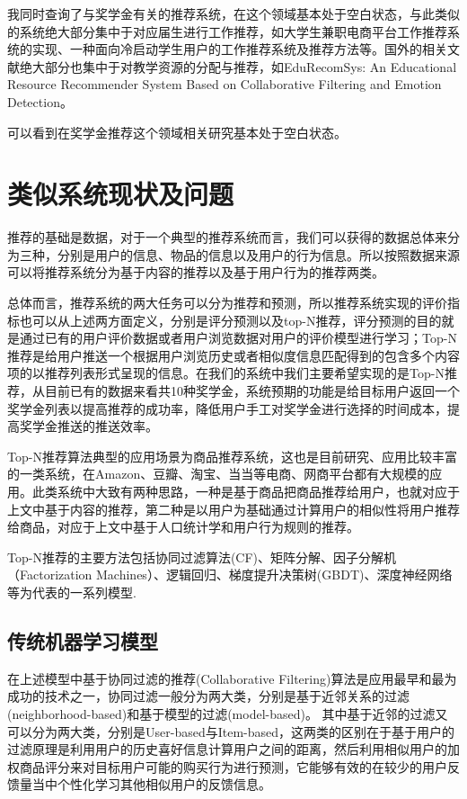 我同时查询了与奖学金有关的推荐系统，在这个领域基本处于空白状态，与此类似的系统绝大部分集中于对应届生进行工作推荐，如大学生兼职电商平台工作推荐系统的实现\cite{郭洁畅2017大学生兼职电商平台工作推荐系统的实现}、一种面向冷启动学生用户的工作推荐系统及推荐方法\cite{一种面向冷启动学生用户的工作推荐系统及推荐方法}等。国外的相关文献绝大部分也集中于对教学资源的分配与推荐，如EduRecomSys: An Educational Resource Recommender System Based on Collaborative Filtering and Emotion Detection\cite{bustos2020edurecomsys}。

可以看到在奖学金推荐这个领域相关研究基本处于空白状态。

\section{类似系统现状及问题}

推荐的基础是数据，对于一个典型的推荐系统而言，我们可以获得的数据总体来分为三种，分别是用户的信息、物品的信息以及用户的行为信息。所以按照数据来源可以将推荐系统分为基于内容的推荐以及基于用户行为的推荐两类。

总体而言，推荐系统的两大任务可以分为推荐和预测，所以推荐系统实现的评价指标也可以从上述两方面定义，分别是评分预测以及top-N推荐，评分预测的目的就是通过已有的用户评价数据或者用户浏览数据对用户的评价模型进行学习；Top-N推荐是给用户推送一个根据用户浏览历史或者相似度信息匹配得到的包含多个内容项的以推荐列表形式呈现的信息。在我们的系统中我们主要希望实现的是Top-N推荐，从目前已有的数据来看共10种奖学金，系统预期的功能是给目标用户返回一个奖学金列表以提高推荐的成功率，降低用户手工对奖学金进行选择的时间成本，提高奖学金推送的推送效率。

Top-N推荐算法典型的应用场景为商品推荐系统，这也是目前研究、应用比较丰富的一类系统，在Amazon、豆瓣、淘宝、当当等电商、网商平台都有大规模的应用。此类系统中大致有两种思路，一种是基于商品把商品推荐给用户，也就对应于上文中基于内容的推荐，第二种是以用户为基础通过计算用户的相似性将用户推荐给商品，对应于上文中基于人口统计学和用户行为规则的推荐。

Top-N推荐的主要方法包括协同过滤算法(CF)、矩阵分解、因子分解机（Factorization Machines）、逻辑回归、梯度提升决策树(GBDT)、深度神经网络等为代表的一系列模型.

\subsection{传统机器学习模型}

在上述模型中基于协同过滤的推荐(Collaborative Filtering)算法是应用最早和最为成功的技术之一，协同过滤一般分为两大类，分别是基于近邻关系的过滤(neighborhood-based)和基于模型的过滤(model-based)。
其中基于近邻的过滤又可以分为两大类，分别是User-based与Item-based，这两类的区别在于基于用户的过滤原理是利用用户的历史喜好信息计算用户之间的距离，然后利用相似用户的加权商品评分来对目标用户可能的购买行为进行预测，它能够有效的在较少的用户反馈量当中个性化学习其他相似用户的反馈信息\cite{姜保庆2014基于社交网络的一种个性化推荐算法}。


